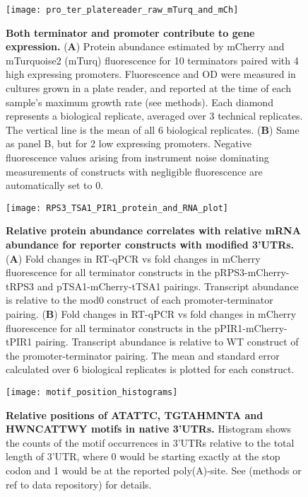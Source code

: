 \documentclass[../main.tex]{subfiles}
\begin{document}
\begin{figure}[h!]
\texttt{[image: pro\_ter\_platereader\_raw\_mTurq\_and\_mCh]} \caption[Both terminator and promoter contribute to gene expression.]{\textbf{Both terminator and promoter contribute to gene expression.} (\textbf{A}) Protein abundance estimated by mCherry and mTurquoise2 (mTurq) fluorescence for 10 terminators paired with 4 high expressing promoters. Fluorescence and OD were measured in cultures grown in a plate reader, and reported at the time of each sample's maximum growth rate (see methods). Each diamond represents a biological replicate, averaged over 3 technical replicates.  The vertical line is the mean of all 6 biological replicates. (\textbf{B}) Same as panel B, but for 2 low expressing promoters. Negative fluorescence values arising from instrument noise dominating measurements of constructs with negligible fluorescence are automatically set to 0.}\label{fig:raw-pro-ter-swap-protein-fluo}
\end{figure}

\begin{figure}[h!]

{\centering \texttt{[image: RPS3\_TSA1\_PIR1\_protein\_and\_RNA\_plot]} 

}

\caption[Relative protein abundance correlates with relative mRNA abundance for reporter constructs with modified 3'UTRs.]{\textbf{Relative protein abundance correlates with relative mRNA abundance for reporter constructs with modified 3'UTRs.} (\textbf{A}) Fold changes in RT-qPCR vs fold changes in mCherry fluorescence for all terminator constructs in the pRPS3-mCherry-tRPS3 and pTSA1-mCherry-tTSA1 pairings. Transcript abundance is relative to the mod0 construct of each promoter-terminator pairing. (\textbf{B}) Fold changes in RT-qPCR vs fold changes in mCherry fluorescence for all terminator constructs in the pPIR1-mCherry-tPIR1 pairing. Transcript abundance is relative to WT construct of the promoter-terminator pairing. The mean and standard error calculated over 6 biological replicates is plotted for each construct.}\label{fig:protein-vs-RNA-plot-motifs}
\end{figure}

\begin{figure}[h!]

{\centering \texttt{[image: motif\_position\_histograms]} 

}

\caption[Relative positions of ATATTC, TGTAHMNTA and HWNCATTWY motifs in native 3'UTRs.]{\textbf{Relative positions of ATATTC, TGTAHMNTA and HWNCATTWY motifs in native 3'UTRs.} Histogram shows the counts of the motif occurrences in 3'UTRs relative to the total length of 3'UTR, where 0 would be starting exactly at the stop codon and 1 would be at the reported poly(A)-site. See (methods or ref to data repository) for details.}\label{fig:motif-position-histograms}
\end{figure}
\end{document}
